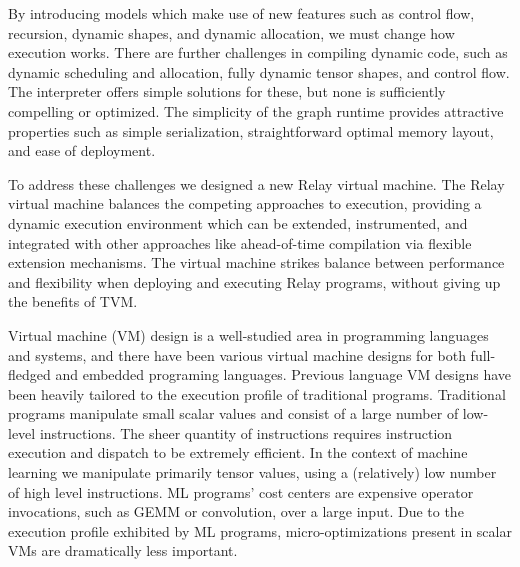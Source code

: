By introducing models which make use of new features such
  as control flow, recursion, dynamic shapes, and dynamic allocation,
  we must change how execution works.
There are further challenges in compiling dynamic code, such as dynamic scheduling and allocation,
  fully dynamic tensor shapes, and control flow.
The interpreter offers simple solutions for these, but none is sufficiently compelling or optimized.
The simplicity of the graph runtime provides attractive
  properties such as simple serialization, straightforward
  optimal memory layout, and ease of deployment.

To address these challenges we designed a new Relay
  virtual machine.
The Relay virtual machine balances the competing approaches to execution,
  providing a dynamic execution environment which can be extended, instrumented,
  and integrated with other approaches
  like ahead-of-time compilation via flexible extension mechanisms.
The virtual machine strikes balance between performance and flexibility
  when deploying and executing Relay programs, without giving up the benefits of TVM.

Virtual machine (VM) design is a well-studied area in programming languages and systems,
  and there have been various virtual machine designs for both full-fledged and embedded programing languages.
Previous language VM designs have been heavily tailored to the execution profile of traditional programs.
Traditional programs manipulate small scalar values
  and consist of a large number of low-level instructions.
The sheer quantity of instructions requires instruction execution
  and dispatch to be extremely efficient.
In the context of machine learning we manipulate primarily tensor values,
  using a (relatively) low number of high level instructions.
ML programs’ cost centers are expensive operator invocations,
  such as GEMM or convolution, over a large input.
Due to the execution profile exhibited by ML programs,
  micro-optimizations present in scalar VMs are dramatically less important.



